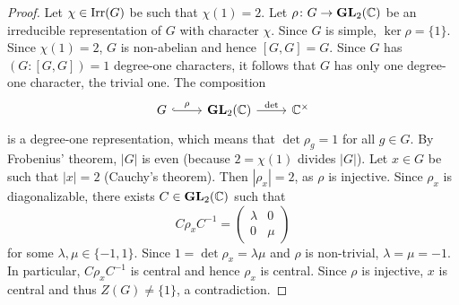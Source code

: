 \begin{proof}
    Let $\chi\in\operatorname{Irr}(G)$ be such that $\chi(1)=2$. Let $\rho\colon G\to\mathbf{GL}_2(\mathbb{C})$
    be an irreducible representation of $G$ with character $\chi$. Since 
    $G$ is simple, $\ker\rho=\{1\}$. Since $\chi(1)=2$, 
    $G$ is non-abelian and hence $[G,G]=G$. Since 
    $G$ has $(G:[G,G])=1$ degree-one characters, it follows that
    $G$ has only one degree-one character, the trivial one. The composition
    \[
    \begin{tikzcd}
    	G & {\GL_2(\C)} & {\C^{\times}}
    	\arrow["{\rho }", hook, from=1-1, to=1-2]
    	\arrow["{\det }", from=1-2, to=1-3]
    \end{tikzcd}
    \]
    is a degree-one representation, which means that $\det\rho_g=1$ for all $g\in G$. 
    By Frobenius' theorem, $|G|$ is even (because 
    $2=\chi(1)$ divides $|G|$). Let $x\in G$ be such that $|x|=2$ (Cauchy's theorem). 
    Then $|\rho_x|=2$, as $\rho$ is injective. Since $\rho_x$ is diagonalizable, 
    there exists $C\in\mathbf{GL}_2(\mathbb{C})$ such that
    \[
    C\rho_xC^{-1}=\begin{pmatrix}
    \lambda&0\\
    0&\mu
    \end{pmatrix}
    \]
    for some $\lambda,\mu\in\{-1,1\}$. Since $1=\det\rho_x=\lambda\mu$ and
    $\rho$ is non-trivial, $\lambda=\mu=-1$. In particular, $C\rho_xC^{-1}$ is central
    and hence $\rho_x$ is central. Since $\rho$ is injective, $x$ is central 
    and thus $Z(G)\ne\{1\}$, a contradiction. 
\end{proof}
